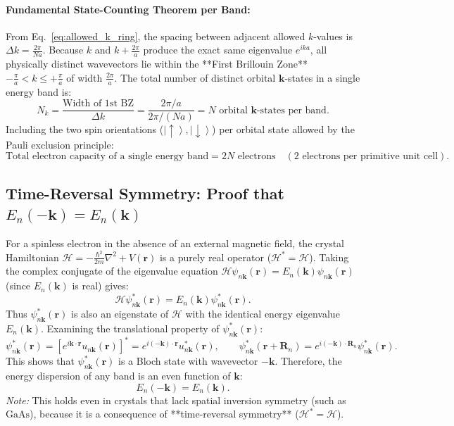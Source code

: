 \documentclass[11pt,a4paper]{article}
\newcommand{\ket}[1]{\left|#1\right\rangle}
\newcommand{\hb}{\hbar}
\newcommand{\hbarsq}{\hb^2}
\newcommand{\kk}{\mathbf{k}}
\newcommand{\RR}{\mathbf{R}}
\newcommand{\rvec}{\mathbf{r}}
\begin{document}
\paragraph{Fundamental State-Counting Theorem per Band:}
From Eq.~\eqref{eq:allowed_k_ring}, the spacing between adjacent allowed $k$-values is $\Delta k = \frac{2\pi}{Na}$. Because $k$ and $k + \frac{2\pi}{a}$ produce the exact same eigenvalue $e^{ika}$, all physically distinct wavevectors lie within the **First Brillouin Zone** $-\frac{\pi}{a} < k \le +\frac{\pi}{a}$ of width $\frac{2\pi}{a}$. The total number of distinct orbital $\kk$-states in a single energy band is:
\begin{equation}
    N_k = \frac{\text{Width of 1st BZ}}{\Delta k} = \frac{2\pi/a}{2\pi/(Na)} = N \text{ orbital } \kk\text{-states per band}.
\end{equation}
Including the two spin orientations ($\ket{\uparrow}, \ket{\downarrow}$) per orbital state allowed by the Pauli exclusion principle:
\begin{equation}
    \boxed{\text{Total electron capacity of a single energy band} = 2N \text{ electrons} \quad (2 \text{ electrons per primitive unit cell}).}
    \label{eq:2N_capacity}
\end{equation}

\subsection{Time-Reversal Symmetry: Proof that \texorpdfstring{$E_n(-\kk) = E_n(\kk)$}{E_n(-k) = E_n(k)}}
\label{sec:time_reversal}
For a spinless electron in the absence of an external magnetic field, the crystal Hamiltonian $\mathcal{H} = -\frac{\hbarsq}{2m}\nabla^2 + V(\rvec)$ is a purely real operator ($\mathcal{H}^* = \mathcal{H}$). Taking the complex conjugate of the eigenvalue equation $\mathcal{H}\psi_{n\kk}(\rvec) = E_n(\kk)\psi_{n\kk}(\rvec)$ (since $E_n(\kk)$ is real) gives:
\begin{equation}
    \mathcal{H}\psi_{n\kk}^*(\rvec) = E_n(\kk)\psi_{n\kk}^*(\rvec).
\end{equation}
Thus $\psi_{n\kk}^*(\rvec)$ is also an eigenstate of $\mathcal{H}$ with the identical energy eigenvalue $E_n(\kk)$. Examining the translational property of $\psi_{n\kk}^*(\rvec)$:
\begin{equation}
    \psi_{n\kk}^*(\rvec) = \left[e^{i\kk\cdot\rvec}u_{n\kk}(\rvec)\right]^* = e^{i(-\kk)\cdot\rvec}u_{n\kk}^*(\rvec), \qquad \psi_{n\kk}^*(\rvec + \RR_n) = e^{i(-\kk)\cdot\RR_n}\psi_{n\kk}^*(\rvec).
\end{equation}
This shows that $\psi_{n\kk}^*(\rvec)$ is a Bloch state with wavevector $-\kk$. Therefore, the energy dispersion of any band is an even function of $\kk$:
\begin{equation}
    \boxed{E_n(-\kk) = E_n(\kk).}
\end{equation}
\textit{Note:} This holds even in crystals that lack spatial inversion symmetry (such as $\text{GaAs}$), because it is a consequence of **time-reversal symmetry** ($\mathcal{H}^* = \mathcal{H}$).
\end{document}
